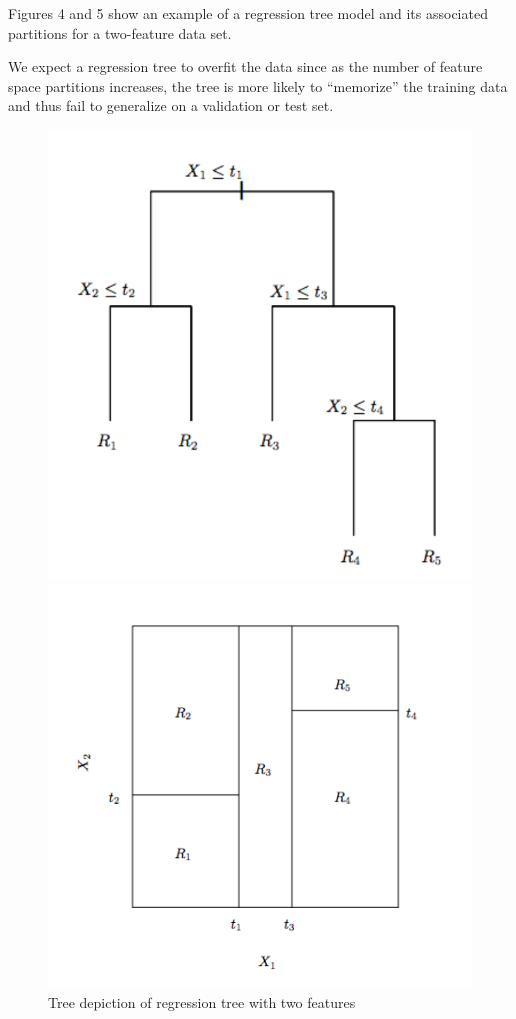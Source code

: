 \documentclass[12pt, fleqn]{article}
\begin{document}
	Figures 4 and 5 show an example of a regression tree model and its associated partitions for a two-feature data set.

	We expect a regression tree to overfit the data since as the number of feature space partitions increases, the tree is more likely to ``memorize'' the training data and thus fail to generalize on a validation or test set.

	\begin{figure}
	\begin{minipage}[c]{0.4\linewidth}
		\includegraphics[width=\linewidth]{regr_tree1.png}
		\caption{Tree depiction of regression tree with two features}
	\end{minipage}
	\hfill
	\begin{minipage}[c]{0.4\linewidth}
		\includegraphics[width=\linewidth]{regr_tree2.png}

\end{minipage}
\end{figure}
\end{document}
